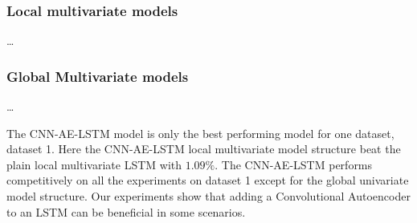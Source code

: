





\subsubsection{Local multivariate models}
\dots










\subsubsection{Global Multivariate models}
\dots














\iffalse
The CNN-AE-LSTM model is only the best performing model for one dataset, dataset 1.
Here the CNN-AE-LSTM local multivariate model structure beat the plain local multivariate LSTM with $1.09\%$.
The CNN-AE-LSTM performs competitively on all the experiments on dataset 1 except for the global univariate model structure.
Our experiments show that adding a Convolutional Autoencoder to an LSTM can be beneficial in some scenarios.


